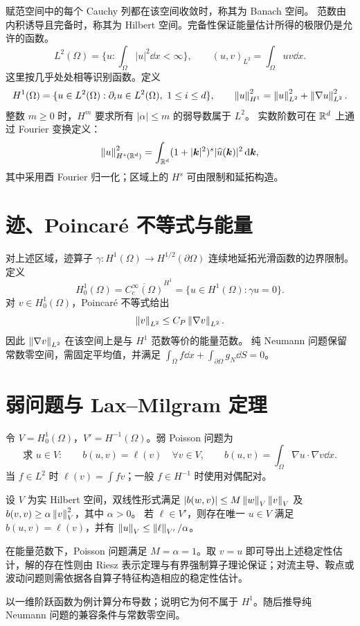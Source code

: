 赋范空间中的每个 Cauchy 列都在该空间收敛时，称其为 Banach 空间。
范数由内积诱导且完备时，称其为 Hilbert 空间。完备性保证能量估计所得的极限仍是允许的函数。
\[
L^2(\Omega)=\{u:\int_\Omega|u|^2\dd x<\infty\},\qquad
(u,v)_{L^2}=\int_\Omega uv\dd x.
\]
这里按几乎处处相等识别函数。定义
\[
H^1(\Omega)=\{u\in L^2(\Omega):\partial_i u\in L^2(\Omega),\ 1\le i\le d\},
\qquad
\left\lVert u\right\rVert_{H^1}^2=\left\lVert u\right\rVert_{L^2}^2+\left\lVert\nabla u\right\rVert_{L^2}^2.
\]
整数 $m\ge0$ 时，$H^m$ 要求所有 $|\alpha|\le m$ 的弱导数属于 $L^2$。
实数阶数可在 $\mathbb R^d$ 上通过 Fourier 变换定义：
\[
\left\lVert u\right\rVert_{H^s(\mathbb R^d)}^2
=\int_{\mathbb R^d}(1+|\bm k|^2)^s|\widehat u(\bm k)|^2\,\mathrm d\bm k,
\]
其中采用酉 Fourier 归一化；区域上的 $H^s$ 可由限制和延拓构造。

\section{迹、Poincar\'e 不等式与能量}
对上述区域，迹算子 $\gamma:H^1(\Omega)\to H^{1/2}(\partial\Omega)$
连续地延拓光滑函数的边界限制。定义
\[
H_0^1(\Omega)=\overline{C_c^\infty(\Omega)}^{H^1}
=\{u\in H^1(\Omega):\gamma u=0\}.
\]
对 $v\in H_0^1(\Omega)$，Poincar\'e 不等式给出
\[
\left\lVert v\right\rVert_{L^2}\le C_P\left\lVert\nabla v\right\rVert_{L^2}.
\]
因此 $\left\lVert\nabla v\right\rVert_{L^2}$ 在该空间上是与 $H^1$ 范数等价的能量范数。
纯 Neumann 问题保留常数零空间，需固定平均值，并满足
$\int_\Omega f\dd x+\int_{\partial\Omega}g_N\dd S=0$。

\section{弱问题与 Lax--Milgram 定理}
令 $V=H_0^1(\Omega)$，$V'=H^{-1}(\Omega)$。弱 Poisson 问题为
\[
\text{求 }u\in V:\qquad b(u,v)=\ell(v)\quad\forall v\in V,\qquad
b(u,v)=\int_\Omega\nabla u\cdot\nabla v\dd x.
\]
当 $f\in L^2$ 时 $\ell(v)=\int fv$；一般 $f\in H^{-1}$ 时使用对偶配对。
\begin{theorem}
设 $V$ 为实 Hilbert 空间，双线性形式满足
$|b(w,v)|\le M\left\lVert w\right\rVert_V\left\lVert v\right\rVert_V$ 及
$b(v,v)\ge\alpha\left\lVert v\right\rVert_V^2$，其中 $\alpha>0$。
若 $\ell\in V'$，则存在唯一 $u\in V$ 满足 $b(u,v)=\ell(v)$，并有
$\left\lVert u\right\rVert_V\le\left\lVert\ell\right\rVert_{V'}/\alpha$。
\end{theorem}
在能量范数下，Poisson 问题满足 $M=\alpha=1$。取 $v=u$ 即可导出上述稳定性估计，解的存在性则由 Riesz 表示定理与有界强制算子理论保证；对流主导、鞍点或波动问题则需依据各自算子特征构造相应的稳定性估计。

{以一维阶跃函数为例计算分布导数；说明它为何不属于 $H^1$。随后推导纯 Neumann 问题的兼容条件与常数零空间。}


